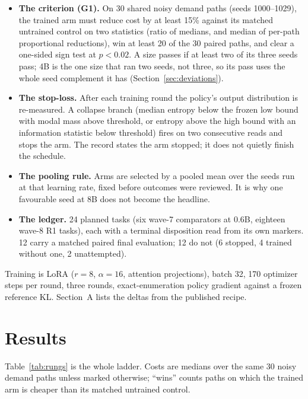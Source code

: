 \documentclass[11pt]{article}
\begin{document}
\begin{itemize}
  \item \textbf{The criterion (G1).} On 30 shared noisy demand paths (seeds 1000--1029), the trained
  arm must reduce cost by at least 15\% against its matched untrained control on two statistics (ratio
  of medians, and median of per-path proportional reductions), win at least 20 of the 30 paired paths,
  and clear a one-sided sign test at $p<0.02$. A size passes if at least two of its three seeds pass;
4B is the one size that ran two seeds, not three, so its pass uses the whole seed complement it has
(Section~\ref{sec:deviations}).
  \item \textbf{The stop-loss.} After each training round the policy's output distribution is
  re-measured. A collapse branch (median entropy below the frozen low bound with modal mass above
  threshold, or entropy above the high bound with an information statistic below threshold) fires on
  two consecutive reads and stops the arm. The record states the arm stopped; it does not quietly
  finish the schedule.
  \item \textbf{The pooling rule.} Arms are selected by a pooled mean over the seeds run at that
  learning rate, fixed before outcomes were reviewed. It is why one favourable seed at 8B does not
  become the headline.
  \item \textbf{The ledger.} 24 planned tasks (six wave-7 comparators at 0.6B, eighteen wave-8 R1
  tasks), each with a terminal disposition read from its own markers. 12 carry a matched paired final
  evaluation; 12 do not (6 stopped, 4 trained without one, 2 unattempted).
\end{itemize}

Training is LoRA \cite{hu2021lora} ($r{=}8$, $\alpha{=}16$, attention projections), batch 32, 170
optimizer steps per round, three rounds, exact-enumeration policy gradient against a frozen reference
KL. Section~A lists
the deltas from the published recipe.

\section{Results}\label{sec:results}

Table~\ref{tab:rungs} is the whole ladder. Costs are medians over the same 30 noisy demand paths unless
marked otherwise; ``wins'' counts paths on which the trained arm is cheaper than its matched untrained
control.
\end{document}
